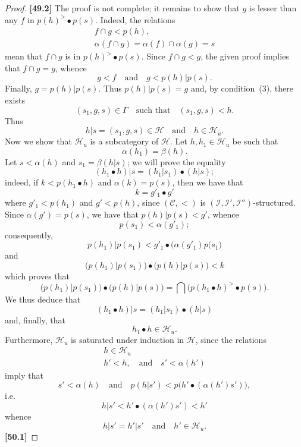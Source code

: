 \documentclass[a4paper,fleqn]{article}
\theoremstyle{plain}
\theoremstyle{definition}
\newenvironment{longcomm}[1]
  {\noindent\textbf{[#1]}\rmfamily}
  {}
\newcommand{\oldpage}[1]{{\marginpar{\footnotesize$\bigg\vert$\,\,\,\,\textit{p.~#1}}}}
\newcommand{\textand}{\quad\text{and}\quad}
\newcommand{\CC}{\mathcal{C}}
\newcommand{\HH}{\mathcal{H}}
\newcommand{\II}{\mathcal{I}}
\begin{document}
\begin{proof}
  \begin{longcomm}{49.2}
    The proof is not complete;
    it remains to show that $g$ is lesser than any $f$ in $p(h)^>\bullet p(s)$.
    Indeed, the relations
    \[
      \begin{gathered}
        f\cap g
        < p(h),
      \\\alpha(f\cap g)
        = \alpha(f)\cap\alpha(g)
        = s
      \end{gathered}
    \]
    mean that $f\cap g$ is in $p(h)^>\bullet p(s)$.
    Since $f\cap g<g$, the given proof implies that $f\cap g=g$, whence
    \[
      g<f
      \textand
      g < p(h)|p(s).
    \]
    Finally, $g=p(h)|p(s)$.
  \end{longcomm}
  Thus $p(h)|p(s)=g$ and, by condition~(3), there exists
  \[
    (s_1,g,s)\in\Gamma
    \quad\text{such that}\quad
    (s_1,g,s) < h.
  \]
  Thus
  \[
    h|s
    = (s_1,g,s)
    \in\HH
    \textand
    h\in\HH_u.
  \]
  Now we show that $\HH_u$ is a subcategory of $\HH$.
  Let $h,h_1\in\HH_u$ be such that
  \[
    \alpha(h_1)
    = \beta(h).
  \]
  Let $s<\alpha(h)$ and $s_1=\beta(h|s)$;
  we will prove the equality
  \[
    (h_1\bullet h)|s
    = (h_1|s_1)\bullet(h|s);
  \]
  indeed, if $k<p(h_1\bullet h)$ and $\alpha(k)=p(s)$, then we have that
  \[
    k = g'_1\bullet g'
  \]
  where $g'_1<p(h_1)$ and $g'<p(h)$, since $(\CC,<)$ is $(\II,\II',\II'')$-structured.
  \oldpage{378}
  Since $\alpha(g')=p(s)$, we have that $p(h)|p(s)<g'$, whence
  \[
    p(s_1)<\alpha(g'_1);
  \]
  consequently,
  \[
    p(h_1)|p(s_1)
    < g'_1\bullet\big(\alpha(g'_1)p(s_1\big)
  \]
  and
  \[\big(p(h_1)|p(s_1)\big)\bullet\big(p(h)|p(s)\big)
    < k
  \]
  which proves that
  \[
    \big(p(h_1)|p(s_1)\big)\bullet\big(p(h)|p(s)\big)
    = \bigcap \big(
      p(h_1\bullet h)^>\bullet p(s)
    \big).
  \]
  We thus deduce that
  \[
    (h_1\bullet h)|s
    = (h_1|s_1)\bullet(h|s)
  \]
  and, finally, that
  \[
    h_1\bullet h\in\HH_u.
  \]
  Furthermore, $\HH_u$ is saturated under induction in $\HH$, since the relations
  \[
    \begin{gathered}
      h\in\HH_u
    \\h'<h,
      \textand
      s'<\alpha(h')
    \end{gathered}
  \]
  imply that
  \[
    s'<\alpha(h)
    \textand
    p(h|s') < p\big(h'\bullet(\alpha(h')s')\big),
  \]
  i.e.
  \[
    h|s'
    < h'\bullet(\alpha(h')s')
    < h'
  \]
  whence
  \[
    h|s'
    = h'|s'
    \textand
    h'\in\HH_u.
  \]
  \begin{longcomm}{50.1}

\end{longcomm}
\end{proof}
\end{document}
